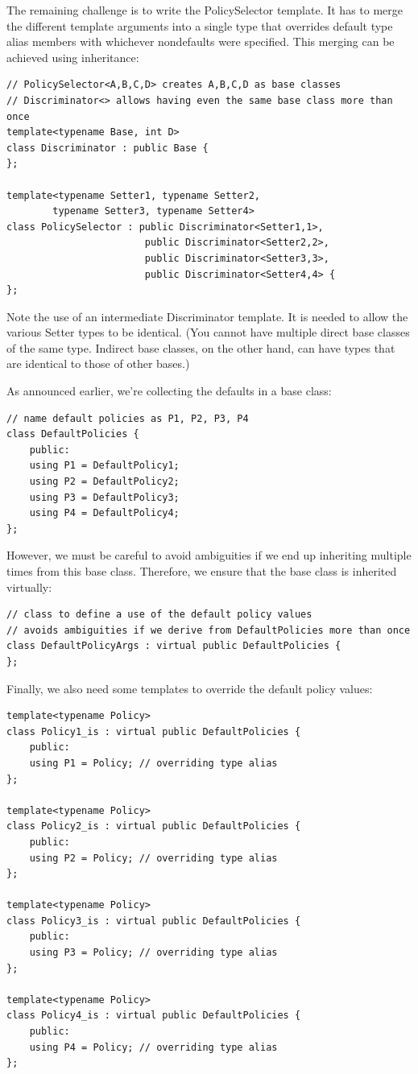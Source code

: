 The remaining challenge is to write the PolicySelector template. It has to merge the different template arguments into a single type that overrides default type alias members with whichever nondefaults were specified. This merging can be achieved using inheritance:

\begin{lstlisting}[style=styleCXX]
// PolicySelector<A,B,C,D> creates A,B,C,D as base classes
// Discriminator<> allows having even the same base class more than once
template<typename Base, int D>
class Discriminator : public Base {
};

template<typename Setter1, typename Setter2,
		typename Setter3, typename Setter4>
class PolicySelector : public Discriminator<Setter1,1>,
						public Discriminator<Setter2,2>,
						public Discriminator<Setter3,3>,
						public Discriminator<Setter4,4> {
};
\end{lstlisting}

Note the use of an intermediate Discriminator template. It is needed to allow the various Setter types to be identical. (You cannot have multiple direct base classes of the same type. Indirect base classes, on the other hand, can have types that are identical to those of other bases.)

As announced earlier, we’re collecting the defaults in a base class:

\begin{lstlisting}[style=styleCXX]
// name default policies as P1, P2, P3, P4
class DefaultPolicies {
	public:
	using P1 = DefaultPolicy1;
	using P2 = DefaultPolicy2;
	using P3 = DefaultPolicy3;
	using P4 = DefaultPolicy4;
};
\end{lstlisting}

However, we must be careful to avoid ambiguities if we end up inheriting multiple times from this base class. Therefore, we ensure that the base class is inherited virtually:

\begin{lstlisting}[style=styleCXX]
// class to define a use of the default policy values
// avoids ambiguities if we derive from DefaultPolicies more than once
class DefaultPolicyArgs : virtual public DefaultPolicies {
};
\end{lstlisting}

Finally, we also need some templates to override the default policy values:

\begin{lstlisting}[style=styleCXX]
template<typename Policy>
class Policy1_is : virtual public DefaultPolicies {
	public:
	using P1 = Policy; // overriding type alias
};

template<typename Policy>
class Policy2_is : virtual public DefaultPolicies {
	public:
	using P2 = Policy; // overriding type alias
};

template<typename Policy>
class Policy3_is : virtual public DefaultPolicies {
	public:
	using P3 = Policy; // overriding type alias
};

template<typename Policy>
class Policy4_is : virtual public DefaultPolicies {
	public:
	using P4 = Policy; // overriding type alias
};
\end{lstlisting}

